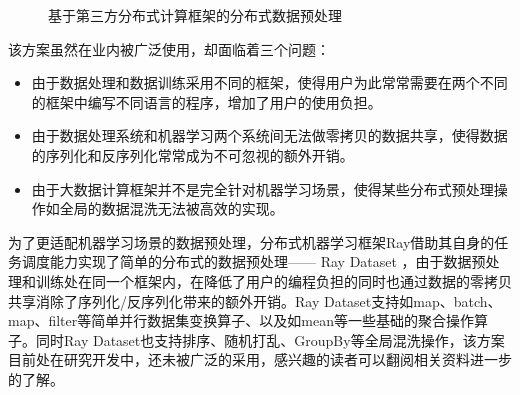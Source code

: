 \documentclass[letterpaper,10pt,english]{sphinxmanual}
\let\sphinxpxdimen\pdfpxdimen\else\newdimen\sphinxpxdimen
\begin{document}
\begin{figure}[H]
\centering
\capstart

\noindent\sphinxincludegraphics[width=800\sphinxpxdimen]{{distribute}.png}
\caption{基于第三方分布式计算框架的分布式数据预处理}\label{\detokenize{chapter_data_processing/extension:id7}}\label{\detokenize{chapter_data_processing/extension:distributed-data-preprocess-based-on-3rd-party-software}}\end{figure}

\sphinxAtStartPar
该方案虽然在业内被广泛使用，却面临着三个问题：
\begin{itemize}
\item {} 
\sphinxAtStartPar
由于数据处理和数据训练采用不同的框架，使得用户为此常常需要在两个不同的框架中编写不同语言的程序，增加了用户的使用负担。

\item {} 
\sphinxAtStartPar
由于数据处理系统和机器学习两个系统间无法做零拷贝的数据共享，使得数据的序列化和反序列化常常成为不可忽视的额外开销。

\item {} 
\sphinxAtStartPar
由于大数据计算框架并不是完全针对机器学习场景，使得某些分布式预处理操作如全局的数据混洗无法被高效的实现。

\end{itemize}

\sphinxAtStartPar
为了更适配机器学习场景的数据预处理，分布式机器学习框架Ray借助其自身的任务调度能力实现了简单的分布式的数据预处理——
Ray Dataset
，由于数据预处理和训练处在同一个框架内，在降低了用户的编程负担的同时也通过数据的零拷贝共享消除了序列化/反序列化带来的额外开销。Ray
Dataset支持如map、batch、map、filter等简单并行数据集变换算子、以及如mean等一些基础的聚合操作算子。同时Ray
Dataset也支持排序、随机打乱、GroupBy等全局混洗操作，该方案目前处在研究开发中，还未被广泛的采用，感兴趣的读者可以翻阅相关资料进一步的了解。

\begin{sphinxVerbatim}[commandchars=\\\{\}]
 \PYGZbs{}
         \PYGZbs{}
       \PYGZbs{}
     \PYGZbs{}
\end{sphinxVerbatim}
\end{document}
